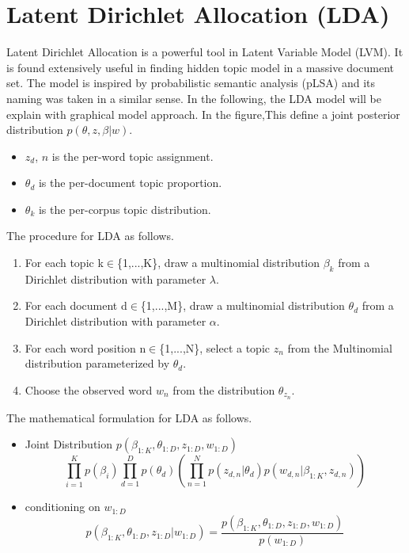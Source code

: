\section{Latent Dirichlet Allocation (LDA)} Latent Dirichlet Allocation\cite{blei_latent_2003} is a powerful tool in Latent Variable Model (LVM). It is found extensively useful in finding hidden topic model in a massive document set. The model is inspired by probabilistic semantic analysis (pLSA)\cite{hofmann_probabilistic_2013} and its naming was taken in a similar sense.
In the following, the LDA model will be explain with graphical model approach. In the figure,This define a joint posterior distribution $p(\theta,z,\beta|w)$. \begin{itemize}
\item $z_d$, $n$ is the per-word topic assignment.
\item $\theta_d$ is the per-document topic proportion.
\item $\theta_k$ is the per-corpus topic distribution.
\end{itemize}
The procedure for LDA as follows. \begin{enumerate}
\item For each topic k$\in$\{1,...,K\}, draw a multinomial distribution $\beta_k$ from a Dirichlet distribution with parameter $\lambda$.
\item For each document d$\in$\{1,...,M\}, draw a multinomial distribution $\theta_d$ from a Dirichlet distribution with parameter $\alpha$.
\item For each word position n$\in$\{1,...,N\}, select a topic $z_n$ from the Multinomial distribution parameterized by $\theta_d$.
\item Choose the observed word $w_n$ from the distribution $\theta_{z_n}$.
\end{enumerate}
The mathematical formulation for LDA as follows.
\begin{itemize}
\item Joint Distribution $p(\beta_{1:K},\theta_{1:D},z_{1:D},w_{1:D})$
\begin{equation*}
\prod_{i=1}^{K}p(\beta_i)\prod_{d=1}^{D}p(\theta_d)(\prod_{n=1}^{N}p(z_{d,n}|\theta_d)p(w_{d,n}|\beta_{1:K},z_{d,n}))
\end{equation*} 
\item conditioning on $w_{1:D}$
\begin{equation*}
p(\beta_{1:K},\theta_{1:D},z_{1:D}|w_{1:D})=\frac{p(\beta_{1:K},\theta_{1:D},z_{1:D},w_{1:D})}{p(w_{1:D})}
\end{equation*}
\end{itemize}
